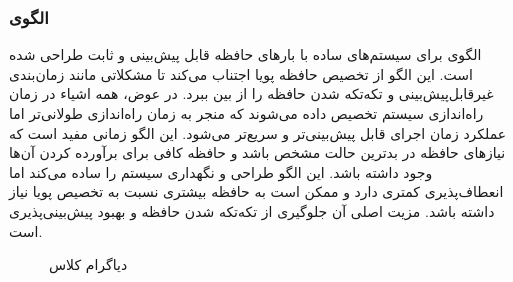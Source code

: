\subsubsection{الگوی }
\label{memStaticAllocSec}
\begin{RTL}
الگوی  \cite{ref4} برای سیستم‌های ساده
با بارهای حافظه قابل پیش‌بینی و ثابت طراحی شده است.
این الگو از تخصیص حافظه پویا اجتناب می‌کند تا مشکلاتی مانند زمان‌بندی
غیرقابل‌پیش‌بینی و تکه‌تکه شدن حافظه را از بین ببرد. در عوض، همه اشیاء
در زمان راه‌اندازی سیستم تخصیص داده می‌شوند که منجر به زمان راه‌اندازی
طولانی‌تر اما عملکرد زمان اجرای قابل پیش‌بینی‌تر و سریع‌تر می‌شود.
این الگو زمانی مفید است که نیازهای حافظه در بدترین حالت مشخص باشد
و حافظه کافی برای برآورده کردن آن‌ها وجود داشته باشد.
این الگو طراحی و نگهداری سیستم را ساده می‌کند اما انعطاف‌پذیری کمتری دارد
و ممکن است به حافظه بیشتری نسبت به تخصیص پویا نیاز داشته باشد.
مزیت اصلی آن جلوگیری از تکه‌تکه شدن حافظه و بهبود پیش‌بینی‌پذیری است.
\end{RTL}
\begin{figure}[h!]
\centering
{}
\caption{دیاگرام کلاس }
\label{memStaticAllocClassDiag}
\end{figure}